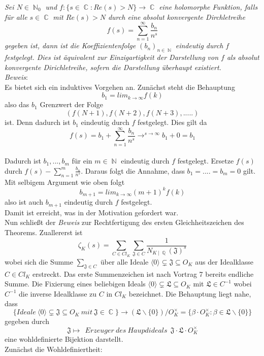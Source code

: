 \documentclass[10pt,a4paper]{article}
\DeclareMathOperator{\C}{\mathbb{C}}
\DeclareMathOperator{\Q}{\mathbb{Q}}
\DeclareMathOperator{\N}{\mathbb{N}}
\begin{document}
 \textit{Sei $N \in \N_0$ und $f \colon \{s \in \C \colon Re(s)>N\}\rightarrow \C$ eine holomorphe Funktion, falls für alle $s \in \C$ mit $Re(s) >N$ durch eine absolut konvergente Dirchletreihe $$f(s) = \sum_{n=1}^{\infty}\frac{b_n}{n^s}$$gegeben ist, dann ist die Koeffizientenfolge $(b_n)_{n \in \N}$ eindeutig durch $f$ festgelegt. Dies ist äquivalent zur Einzigartigkeit der Darstellung von $f$ als absolut konvergente Dirichletreihe, sofern die Darstellung überhaupt existiert.}
 \\
 \textit{Beweis}:
 \\
 Es bietet sich ein induktives Vorgehen an.
Zunächst steht die Behauptung $$b_1= lim_{k \to \infty} f(k)$$also das $b_1$ Grenzwert der Folge $$(f(N+1),f(N+2),f(N+3),.....)$$ ist. Denn dadurch ist $b_1$ eindeutig durch $f$ festgelegt. Dies gilt da $$f(s)=b_1+\sum_{n=1}^{\infty} \frac{b_n}{n^s}\rightarrow^{s \to \infty} b_1 + 0 = b_1$$
\\ 
Dadurch ist $b_1,...,b_m$ für ein $m \in \N$ eindeutig durch $f$ festgelegt. Ersetze $f(s)$ durch $f(s)-\sum_{n=1}^{m}\frac{b_n}{n^s}$. Daraus folgt die Annahme, dass $b_1=....=b_m=0$ gilt. Mit selbigem Argument wie oben folgt $$b_{m+1}=lim_{k\to \infty}(m+1)^k f(k)$$ also ist auch $b_{m+1}$ eindeutig durch $f$ festgelegt.
\\
Damit ist erreicht, was in der Motivation gefordert war.
\\
Nun schließt der \textit{Beweis} zur Rechtfertigung des ersten Gleichheitszeichen des Theorems. Zuallererst ist $$\zeta_K(s) = \sum_{C \in Cl_K}\sum_{\mathfrak{J} \in C}\frac{1}{N_{K\mid \Q}(\mathfrak{J})^s}$$wobei sich die Summe $\sum_{\mathfrak{J} \in C}$ über alle Ideale $\langle 0 \rangle \subsetneq \mathfrak{J} \subseteq O_K$ aus der Idealklasse $C \in Cl_K$ erstreckt. Das erste Summenzeichen ist nach Vortrag 7 bereits endliche Summe. Die Fixierung eines beliebigen Ideals $\langle 0 \rangle \subsetneq \mathfrak{L} \subseteq O_K$ mit $\mathfrak{L}\in C^{-1}$ wobei $C^{-1}$ die inverse Idealklasse zu $C$ in $Cl_K$ bezeichnet. Die Behauptung liegt nahe, dass  $$\{Ideale \ \langle 0 \rangle \subsetneq \mathfrak{J} \subseteq O_K \ mit \ \mathfrak{J} \in \C\}\rightarrow(\mathfrak{L}\backslash\{0\})/O_K^{\times}=\{ \beta \cdot O_K^{\times} \colon \beta \in \mathfrak{L}\backslash\{ 0\}\}$$ gegeben durch $$\mathfrak{J}\mapsto \ \ Erzeuger\ des\ Haupdideals \ \ \mathfrak{J\cdot L}\cdot O_K^{\times}$$ eine wohldefinierte Bijektion darstellt. \\
Zunächst die Wohldefiniertheit:
\\
\end{document}
